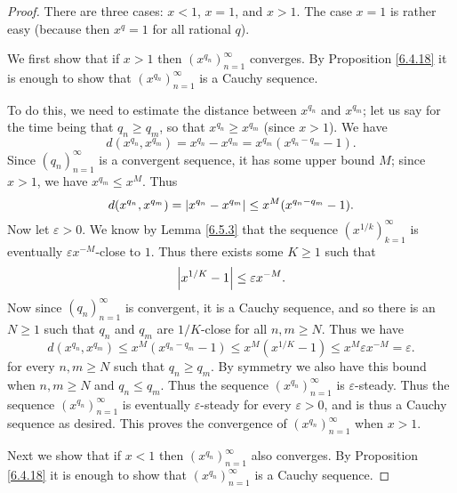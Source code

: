 \begin{proof}
    There are three cases: \(x < 1\), \(x = 1\), and \(x > 1\).
    The case \(x = 1\) is rather easy (because then \(x^q = 1\) for all rational \(q\)).

    We first show that if \(x > 1\) then \((x^{q_n})_{n = 1}^\infty\) converges.
    By Proposition \ref{6.4.18} it is enough to show that \((x^{q_n})_{n = 1}^\infty\) is a Cauchy sequence.

    To do this, we need to estimate the distance between \(x^{q_n}\) and \(x^{q_m}\);
    let us say for the time being that \(q_n \geq q_m\), so that \(x^{q_n} \geq x^{q_m}\) (since \(x > 1\)).
    We have
    \[
        d(x^{q_n}, x^{q_m}) = x^{q_n} - x^{q_m} = x^{q_m} (x^{q_n - q_m} - 1).
    \]
    Since \((q_n)_{n = 1}^\infty\) is a convergent sequence, it has some upper bound \(M\);
    since \(x > 1\), we have \(x^{q_m} \leq x^M\).
    Thus
    \[
        d(x^{q_n}, x^{q_m}) = \left\lvert x^{q_n} - x^{q_m}\right\rvert \leq x^M (x^{q_n - q_m} - 1).
    \]
    Now let \(\varepsilon > 0\).
    We know by Lemma \ref{6.5.3} that the sequence \((x^{1 / k})_{k = 1}^\infty\) is eventually \(\varepsilon x^{-M}\)-close to \(1\).
    Thus there exists some \(K \geq 1\) such that
    \[
        \left\lvert x^{1 / K} - 1\right\rvert \leq \varepsilon x^{-M}.
    \]
    Now since \((q_n)_{n = 1}^\infty\) is convergent, it is a Cauchy sequence, and so there is an \(N \geq 1\) such that \(q_n\) and \(q_m\) are \(1 / K\)-close for all \(n, m \geq N\).
    Thus we have
    \[
        d(x^{q_n}, x^{q_m}) \leq x^M (x^{q_n - q_m} - 1) \leq x^M (x^{1 / K} - 1) \leq x^M \varepsilon x^{-M} = \varepsilon.
    \]
    for every \(n, m \geq N\) such that \(q_n \geq q_m\).
    By symmetry we also have this bound when \(n, m \geq N\) and \(q_n \leq q_m\).
    Thus the sequence \((x^{q_n})_{n = 1}^\infty\) is \(\varepsilon\)-steady.
    Thus the sequence \((x^{q_n})_{n = 1}^\infty\) is eventually \(\varepsilon\)-steady for every \(\varepsilon > 0\), and is thus a Cauchy sequence as desired.
    This proves the convergence of \((x^{q_n})_{n = 1}^\infty\) when \(x > 1\).

    Next we show that if \(x < 1\) then \((x^{q_n})_{n = 1}^\infty\) also converges.
    By Proposition \ref{6.4.18} it is enough to show that \((x^{q_n})_{n = 1}^\infty\) is a Cauchy sequence.


\end{proof}
